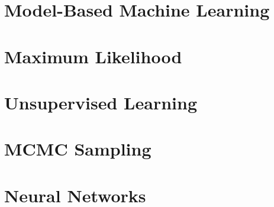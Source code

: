 \documentclass{../cs-classes/cs-classes}
\begin{document}
\section{Model-Based Machine Learning}

\section{Maximum Likelihood}

\section{Unsupervised Learning}

\section{MCMC Sampling}

\section{Neural Networks}
\end{document}
